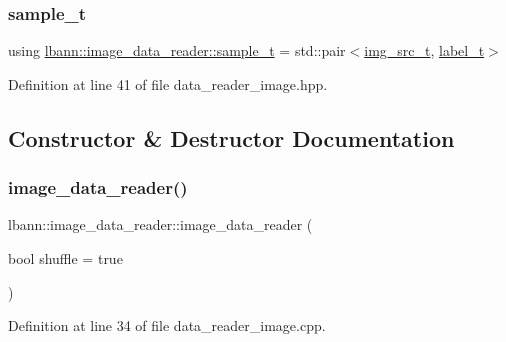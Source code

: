 \subsubsection{\texorpdfstring{sample\+\_\+t}{sample\_t}}
{\footnotesize\ttfamily using \hyperlink{classlbann_1_1image__data__reader_a7580011ef6ef9da32e1a3bc49ad0706c}{lbann\+::image\+\_\+data\+\_\+reader\+::sample\+\_\+t} =  std\+::pair$<$\hyperlink{classlbann_1_1image__data__reader_acd2b41459e901a3aed39fd3be7270fa2}{img\+\_\+src\+\_\+t}, \hyperlink{classlbann_1_1image__data__reader_a7645f17852c990e80b1530509ff5e87c}{label\+\_\+t}$>$}



Definition at line 41 of file data\+\_\+reader\+\_\+image.\+hpp.



\subsection{Constructor \& Destructor Documentation}
\mbox{\label{classlbann_1_1image__data__reader_a582185ab03c4643117fd93e0ba843882}} 
\subsubsection{\texorpdfstring{image\+\_\+data\+\_\+reader()}{image\_data\_reader()}\hspace{0.1cm}{\footnotesize\ttfamily [1/2]}}
{\footnotesize\ttfamily lbann\+::image\+\_\+data\+\_\+reader\+::image\+\_\+data\+\_\+reader (\begin{DoxyParamCaption}\item[{bool}]{shuffle = {\ttfamily true} }\end{DoxyParamCaption})}



Definition at line 34 of file data\+\_\+reader\+\_\+image.\+cpp.


